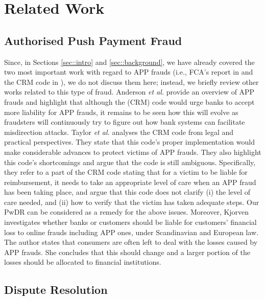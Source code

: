 
\section{Related Work}


\subsection{Authorised Push Payment Fraud}

Since, in Sections \ref{sec::intro} and \ref{sec::background}, we have already covered the two most important work  with regard to APP frauds  (i.e.,  FCA's  report in \cite{2021-Half-Year-Fraud-Update} and the CRM code in \cite{CRM-code}), we do not discuss them here; instead,  we briefly  review other works related to this type of fraud. Anderson \textit{et al.} \cite{anderson2019measuring} provide an overview of APP frauds and highlight that although  the (CRM) code would urge  banks to accept more liability for APP frauds, it remains to be seen how this will evolve as   fraudsters will continuously try to figure out how bank systems can facilitate misdirection attacks. Taylor \textit{et al.} \cite{taylor2020new} analyses the CRM code from legal and practical perspectives. They  state that this code's proper implementation would make considerable advances to protect victims of APP frauds. They also highlight this code's shortcomings and argue that the code is still ambiguous. Specifically, they refer to a part of the  CRM code  stating that for a victim to be liable for reimbursement,  it needs to take an appropriate level of  care when an APP fraud has been taking place, and argue that   this  code does not  clarify (i)  the level of care needed,  and (ii) how to verify that the victim has taken adequate steps. Our PwDR  can be considered as a remedy for the above issues.   Moreover, Kjorven \cite{kjorven2020pays} investigates whether banks or customers should be liable for customers' financial loss to online  frauds including APP ones, under Scandinavian and European law. The author states  that consumers are often left to deal with the losses caused by APP frauds. She concludes that this should change and  a larger portion of the losses should be allocated to financial institutions.


\subsection{Dispute Resolution}

